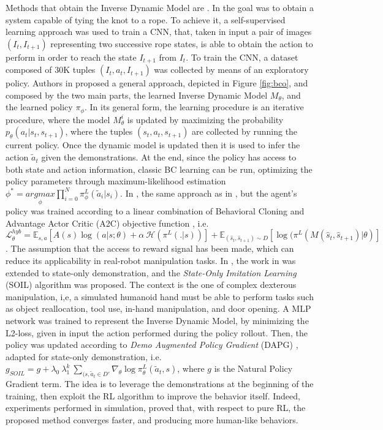 \newline Methods that obtain  the Inverse Dynamic Model are \cite{nair2017combining,torabi2018bco,guo2019hybrid_rl,radosavovic2021state_only_demo}. In \cite{nair2017combining} the goal was to obtain a system capable of tying the knot to a rope. To achieve it, a self-supervised learning approach was used to train a CNN, that, taken in input a pair of images $(I_{t}, I_{t+1})$ representing two successive rope states, is able to obtain the action to perform in order to reach the state $I_{t+1}$ from $I_{t}$. To train the CNN, a dataset composed of 30K tuples $(I_{t},a_{t},I_{t+1})$ was collected by means of an exploratory policy. Authors in \cite{torabi2018bco} proposed a general approach, depicted in Figure \ref{fig:bco}, and composed by the two main parts, the learned Inverse Dynamic Model $M_{\theta}$, and the learned policy $\pi_{\phi}$. In its general form, the learning procedure is an iterative procedure, where the model $M_{\theta}^{i}$ is updated by maximizing the probability $p_{\theta}(a_{t}|s_{t},s_{t+1})$, where the tuples $(s_{t},a_{t},s_{t+1})$ are collected by running the current policy. Once the dynamic model is updated then it is used to infer the action $\tilde{a}_{t}$ given the demonstrations. At the end, since the policy has access to both state and action information, classic BC learning can be run, optimizing the policy parameters through maximum-likelihood estimation $\phi^{*} = \underset{\phi}{argmax} \prod_{i=0}^{N} \pi^{L}_{\phi}(\tilde{a}_{i}|s_{i})$. In \cite{guo2019hybrid_rl}, the same approach as in \cite{torabi2018bco}, but the agent's policy was trained according to a linear combination of Behavioral Cloning and Advantage Actor Critic (A2C) objective function \cite{mnih2016a2c}, i.e. $\mathcal{L}^{hyb}_{\theta} = \mathbb{E}_{s,a}[A(s)\log(a|s;\theta)+\alpha \ \mathcal{H}(\pi^{L}(.|s))] + \mathbb{E}_{(\hat{s}_{t},\hat{s}_{t+1})\sim D}[\log(\pi^{L}(M(\hat{s}_{t},\hat{s}_{t+1})|\theta)]$. The assumption that the access to reward signal has been made, which can reduce its applicability in real-robot manipulation tasks. In \cite{radosavovic2021state_only_demo}, the work in \cite{Rajeswaran18_learning_complex_dexterous} was extended to state-only demonstration, and the \textit{State-Only Imitation Learning} (SOIL) algorithm was proposed. The context is the one of complex dexterous manipulation, i,e, a simulated humanoid hand must be able to perform tasks such as object reallocation, tool use, in-hand manipulation, and door opening. A MLP network was trained to represent the Inverse Dynamic Model, by minimizing the L2-loss, given in input the action performed during the policy rollout. Then, the policy was updated according to \textit{Demo Augmented Policy Gradient} (DAPG) \cite{Rajeswaran18_learning_complex_dexterous}, adapted for state-only demonstration, i.e. $g_{SOIL} = g + \lambda_{0} \ \lambda_{1}^{k} \ \sum_{(s,\tilde{a}_{t} \in D'} \nabla_{\theta}\log\pi^{L}_{\theta}(\tilde{a}_{t},s)$, where $g$ is the Natural Policy Gradient term. The idea is to leverage the demonstrations at the beginning of the training, then exploit the RL algorithm to improve the behavior itself. Indeed, experiments performed in simulation, proved that, with respect to pure RL, the proposed method converges faster, and producing more human-like behaviors.
